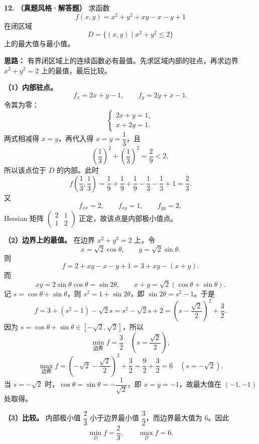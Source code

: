 \else \answerarea[4] \fi%

\textbf{12.} \textbf{（真题风格·解答题）} 求函数
\[
f(x,y)=x^2+y^2+xy-x-y+1
\]
在闭区域
\[
D=\{(x,y)\mid x^2+y^2\le2\}
\]
上的最大值与最小值。

\ifshowsolutions%
\textbf{思路：} 有界闭区域上的连续函数必有最值。先求区域内部的驻点，再求边界 \(x^2+y^2=2\) 上的最值，最后比较。

\textbf{（1）内部驻点。}
\[
f_x=2x+y-1,\qquad f_y=2y+x-1.
\]
令其为零：
\[
\begin{cases}
2x+y=1,\\
x+2y=1.
\end{cases}
\]
两式相减得 \(x=y\)，再代入得 \(x=y=\dfrac13\)，且
\[
\left(\frac13\right)^2+\left(\frac13\right)^2=\frac29<2,
\]
所以该点位于 \(D\) 的内部。此时
\[
f\left(\frac13,\frac13\right)
=\frac19+\frac19+\frac19-\frac13-\frac13+1
=\frac23.
\]
又
\[
f_{xx}=2,\qquad f_{xy}=1,\qquad f_{yy}=2,
\]
Hessian 矩阵 \(\begin{pmatrix}2&1\\1&2\end{pmatrix}\) 正定，故该点是内部极小值点。

\textbf{（2）边界上的最值。} 在边界 \(x^2+y^2=2\) 上，令
\[
x=\sqrt2\cos\theta,\qquad y=\sqrt2\sin\theta.
\]
则
\[
f=2+xy-x-y+1=3+xy-(x+y).
\]
而
\[
xy=2\sin\theta\cos\theta=\sin2\theta,\qquad
x+y=\sqrt2(\cos\theta+\sin\theta).
\]
记 \(s=\cos\theta+\sin\theta\)，则 \(s^2=1+\sin2\theta\)，即 \(\sin2\theta=s^2-1\)。于是
\[
f=3+(s^2-1)-\sqrt2s
=s^2-\sqrt2s+2
=\left(s-\frac{\sqrt2}{2}\right)^2+\frac32.
\]
因为 \(s=\cos\theta+\sin\theta\in[-\sqrt2,\sqrt2]\)，所以
\[
\min_{\text{边界}}f=\frac32
\quad\left(s=\frac{\sqrt2}{2}\right),
\]
\[
\max_{\text{边界}}f
=\left(-\sqrt2-\frac{\sqrt2}{2}\right)^2+\frac32
=\frac92+\frac32=6
\quad(s=-\sqrt2).
\]
当 \(s=-\sqrt2\) 时，\(\cos\theta=\sin\theta=-\dfrac1{\sqrt2}\)，即 \(x=y=-1\)，故最大值在 \((-1,-1)\) 处取得。

\textbf{（3）比较。} 内部极小值 \(\dfrac23\) 小于边界最小值 \(\dfrac32\)，而边界最大值为 \(6\)。因此
\[
\min_D f=\frac23,\qquad \max_D f=6.
\]

\else \answerarea[10] \fi%
